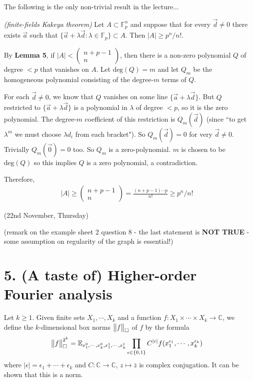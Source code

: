 \documentclass[12pt,a4paper]{report}
\newenvironment{proof}
{\begin{changemargin}{1cm}{0.5cm}
	}%
	{\end{changemargin}
}
\begin{document}
The following is the only non-trivial result in the lecture...
\s

 \emph{(finite-fields Kakeya theorem)} Let $A\subset \mathbb{F}_p^n$ and suppose that for every $\vec{d} \neq 0$ there exists $\vec{a}$ such that $\{ \vec{a} + \lambda \vec{d} : \lambda \in \mathbb{F}_p \} \subset A $. Then $|A| \geq p^n / n!$.
\begin{proof}
\pf By \textbf{Lemma 5}, if $|A| < \begin{pmatrix}
n+p-1 \\
n
\end{pmatrix}$, then there is a non-zero polynomial $Q$ of degree $<p$ that vanishes on $A$. Let $\text{deg}(Q) =m$ and let $Q_m$ be the homogeneous polynomial consisting of the degree-$m$ terms of $Q$.

\quad For each $\vec{d} \neq 0$, we know that $Q$ vanishes on some line $\{ \vec{a} + \lambda \vec{d} \}$. But $Q$ restricted to $\{ \vec{a} + \lambda \vec{d} \}$ is a polynomial in $\lambda$ of degree $<p$, so it is the zero polynomial. The degree-$m$ coefficient of this restriction is $Q_m(\vec{d})$ (since ``to get $\lambda^m$ we must choose $\lambda d_i$ from each bracket"). So $Q_m(\vec{d}) =0$ for very $\vec{d} \neq 0$. Trivially $Q_m(\vec{0}) =0$ too. So $Q_m$ is a zero-polynomial. $m$ is chosen to be $\text{deg}(Q)$ so this implies $Q$ is a zero polynomial, a contradiction.

\quad Therefore, 
\begin{align*}
|A| \geq \begin{pmatrix}
n+p-1 \\
n
\end{pmatrix} = \frac{(n+p-1)\cdots p}{n!} \geq p^n /n!
\end{align*}

\eop
\end{proof}
\s

\newday

(22nd November, Thursday)
\s

(remark on the example sheet 2 question 8 - the last statement is \textbf{NOT TRUE} - some assumption on regularity of the graph is essential!)

\section*{5. (A taste of) Higher-order Fourier analysis}

Let $k\geq 1$. Given finite sets $X_1, \cdots, X_k$ and a function $f: X_1 \times \cdots \times X_k \rightarrow \mathbb{C}$, we define the $k$-dimensional box norms $\bigl\lVert f\bigr\rVert_{\tiny{\square}}$ of $f$ by the formula
\begin{align*}
\bigl\lVert f\bigr\rVert_{\tiny{\square}}^{2^k} = \mathbb{E}_{x_1^0,\cdots, x_k^0, x_1^1,\cdots, x_k^1} \prod_{\epsilon \in \{0,1\}} C^{|\epsilon|} f(x_1^{\epsilon_1},\cdots, x_k^{\epsilon_k})
\end{align*}
where $|\epsilon| = \epsilon_1 + \cdots + \epsilon_k$ and $C : \mathbb{C} \rightarrow \mathbb{C}$, $z\mapsto \bar{z}$ is complex conjugation. It can be shown that this is a norm.
\end{document}
